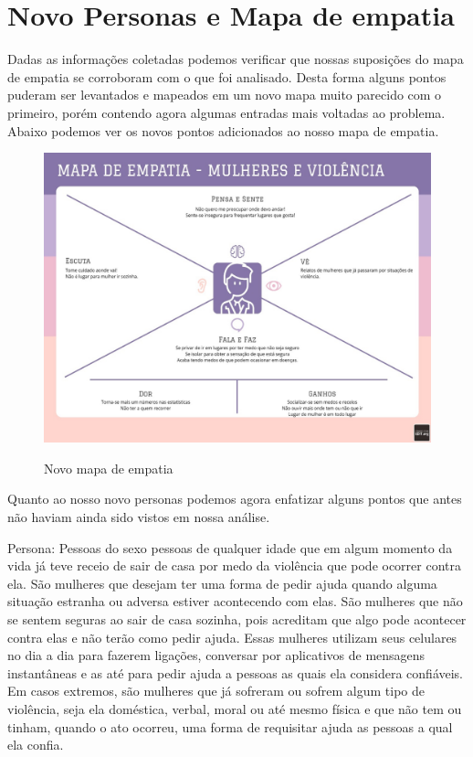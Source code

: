 \section{Novo Personas e Mapa de empatia}
Dadas as informações coletadas podemos verificar que nossas suposições do mapa de empatia se corroboram com o que foi analisado. Desta forma alguns pontos puderam ser levantados e mapeados em um novo mapa muito parecido com o primeiro, porém contendo agora algumas entradas mais voltadas ao problema. Abaixo podemos ver os novos pontos adicionados ao nosso mapa de empatia.
\begin{figure}[h]
  \begin{center}
  \includegraphics[width=1.0\linewidth]{images/mapa-empatia-novo.jpeg}\\
  \end{center}
  \caption[Nobo mapa de mepatia]{Novo mapa de empatia}
  \label{fig:novo-mapa-empatia}
\end{figure}

Quanto ao nosso novo personas podemos agora enfatizar alguns pontos que antes não haviam ainda sido vistos em nossa análise.

Persona: Pessoas do sexo pessoas de qualquer idade que em algum momento da vida já teve receio de sair de casa por medo da violência que pode ocorrer contra ela. São mulheres que desejam ter uma forma de pedir ajuda quando alguma situação estranha ou adversa estiver acontecendo com elas. São mulheres que não se sentem seguras ao sair de casa sozinha, pois acreditam que algo pode acontecer contra elas e não terão como pedir ajuda. Essas mulheres utilizam seus celulares no dia a dia para fazerem ligações, conversar por aplicativos de mensagens instantâneas e as até para pedir ajuda a pessoas as quais ela considera confiáveis. Em casos extremos, são mulheres que já sofreram ou sofrem algum tipo de violência, seja ela doméstica, verbal, moral ou até mesmo física e que não tem ou tinham, quando o ato ocorreu, uma forma de requisitar ajuda as pessoas a qual ela confia.
